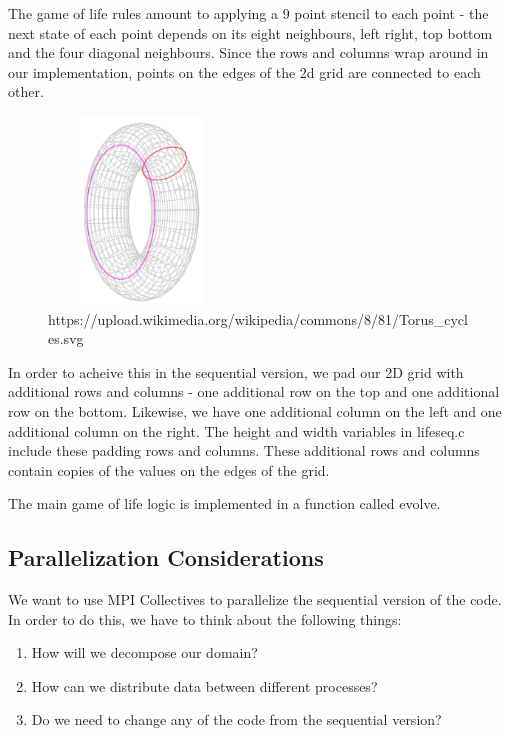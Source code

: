 \documentclass[11pt]{article}
\begin{document}
The game of life rules amount to applying a 9 point stencil to each point - the next state of each point depends 
on its eight neighbours, left right, top bottom and the four diagonal neighbours. Since the rows and columns 
wrap around in our implementation, points on the edges of the 2d grid are connected to each other. 

\begin{figure}[htbp]
\centering
\includegraphics[width=5cm,height=5cm]{torus.png}
https://upload.wikimedia.org/wikipedia/commons/8/81/Torus\_cycles.svg
\end{figure}

In order to acheive this in the sequential version, we pad our 2D grid with additional rows and columns - one additional row on the 
top and one additional row on the bottom. Likewise, we have one additional column on the left and one additional 
column on the right. The height and width variables in life\textunderscore{}seq.c include these padding rows and columns. These 
additional rows and columns contain copies of the values on the edges of the grid. 

The main game of life logic is implemented in a function called evolve.  

\subsection{Parallelization Considerations}
\label{sec:orgee52928}

We want to use MPI Collectives to parallelize the sequential version of the code. 
In order to do this, we have to think about the following things: 

\begin{enumerate}
\item How will we decompose our domain?
\item How can we distribute data between different processes?
\item Do we need to change any of the code from the sequential version?
\end{enumerate}
\end{document}
